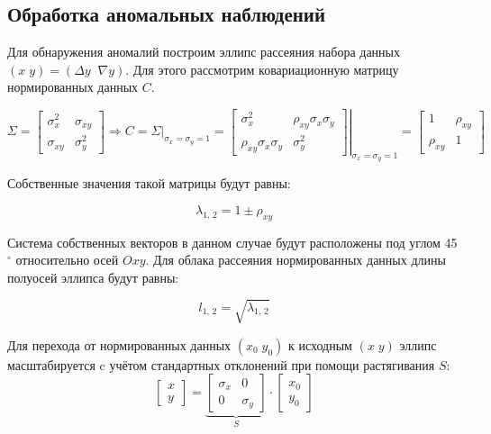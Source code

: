 \subsection{Обработка аномальных наблюдений}

Для обнаружения аномалий построим эллипс рассеяния набора данных $\left(x\;y\right)=\left( \Delta y\;\;\nabla y \right)$. Для этого рассмотрим ковариационную матрицу нормированных данных $C$.

\begin{equation*}
	\Sigma = \begin{bmatrix}
		\sigma_x ^ 2 & \sigma_{xy} \\ 
		\sigma_{xy} & \sigma_y ^ 2
	\end{bmatrix} \Rightarrow
	C = \left. \Sigma \right|_{\sigma_x = \sigma_y = 1} = \left.\begin{bmatrix}
		\sigma_x^2 & \rho_{xy} \sigma_x \sigma_y \\
		\rho_{xy} \sigma_x \sigma_y & \sigma_y^2
	\end{bmatrix} \right|_{\sigma_x = \sigma_y = 1} = \begin{bmatrix}
		1 & \rho_{xy} \\
		\rho_{xy} & 1
	\end{bmatrix}
\end{equation*}

Собственные значения такой матрицы будут равны:

\begin{equation}
	\lambda_{1,\,2} = 1 \pm \rho_{xy}
\end{equation}

Система собственных векторов в данном случае будут расположены под углом 45$^\circ$ относительно осей $Oxy$. Для облака рассеяния нормированных данных длины полуосей эллипса будут равны:

\begin{equation}
	l_{1,\,2} = \sqrt{\lambda_{1,\,2}}
\end{equation}

Для перехода от нормированных данных $(x_0\;y_0)$ к исходным $(x\;y)$ эллипс масштабируется c учётом стандартных отклонений при помощи растягивания $S$:
\begin{equation}
	\begin{bmatrix}
		x \\ y
	\end{bmatrix} = \underbrace{\begin{bmatrix}
		\sigma_x & 0 \\ 0 & \sigma_y
	\end{bmatrix}}_{S} \cdot \begin{bmatrix}
		x_0 \\ y_0
	\end{bmatrix}
\end{equation}


